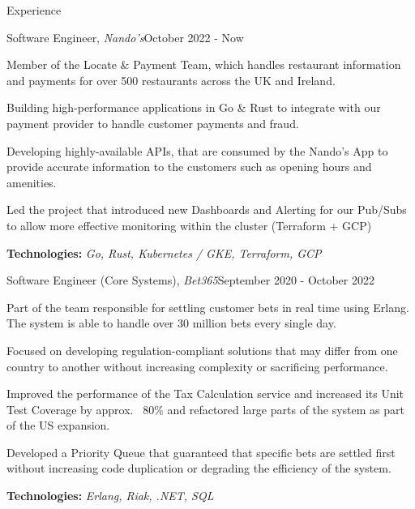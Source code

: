 \documentclass{resume}
\begin{document}
\begin{rSection}{Experience}


    \begin{rSubsection}{Software Engineer, \textit{Nando's}}{October 2022 - Now}{}{}
        \item Member of the Locate \& Payment Team, which handles restaurant information and payments for over 500 restaurants across the UK and Ireland.
        \item Building high-performance applications in Go \& Rust to integrate with our payment provider to handle customer payments and fraud. 
        \item Developing highly-available APIs, that are consumed by the Nando's App to provide accurate information to the customers such as opening hours and amenities.
        \item Led the project that introduced new Dashboards and Alerting for our Pub/Subs to allow more effective monitoring within the cluster (Terraform + GCP)
        \item \textbf{Technologies:} \textit{Go, Rust, Kubernetes / GKE, Terraform, GCP}
    \end{rSubsection}


    \begin{rSubsection}{Software Engineer (Core Systems), \textit{Bet365}}{September 2020 - October 2022}{}{}
        \item Part of the team responsible for settling customer bets in real time using Erlang. The system is able to handle over 30 million bets every single day.
        \item Focused on developing regulation-compliant solutions that may differ from one country to another without increasing complexity or sacrificing performance.
        \item Improved the performance of the Tax Calculation service and increased its Unit Test Coverage by approx. ~80\% and refactored large parts of the system as part of the US expansion.
        \item Developed a Priority Queue that guaranteed that specific bets are settled first without increasing code duplication or degrading the efficiency of the  system.
        \item \textbf{Technologies:} \textit{Erlang, Riak, .NET, SQL}
    \end{rSubsection}


\end{rSection}
\end{document}
